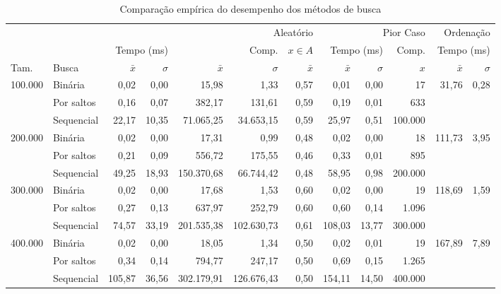 \begin{table}
\caption{Comparação empírica do desempenho dos métodos de busca}
\label{tab:resultados}
\begin{tabular}{llrrrrrrrrrr}
\toprule
 &  & \multicolumn{5}{r}{Aleatório} & \multicolumn{3}{r}{Pior Caso} & \multicolumn{2}{r}{Ordenação} \\
 \cmidrule(lr){3-7} \cmidrule(lr){8-10} \cmidrule(lr){11-12}
 &  & \multicolumn{2}{r}{Tempo (ms)} & \multicolumn{2}{r}{Comp.} & $x \in A$ & \multicolumn{2}{r}{Tempo (ms)} & Comp. & \multicolumn{2}{r}{Tempo (ms)} \\
 \cmidrule(lr){3-4} \cmidrule(lr){5-6} \cmidrule(lr){7-7} \cmidrule(lr){8-9} \cmidrule(lr){10-10} \cmidrule(lr){11-12}
 Tam. & Busca & $\bar{x}$ & $\sigma$ & $\bar{x}$ & $\sigma$ & $\bar{x}$ & $\bar{x}$ & $\sigma$ & $x$ & $\bar{x}$ & $\sigma$ \\
\midrule
\multirow[c]{3}{*}{100.000} & Binária & 0,02 & 0,00 & 15,98 & 1,33 & 0,57 & 0,01 & 0,00 & 17 & \multirow[r]{3}{*}{31,76} & \multirow[r]{3}{*}{0,28} \\
 & Por saltos & 0,16 & 0,07 & 382,17 & 131,61 & 0,59 & 0,19 & 0,01 & 633 \\
 & Sequencial & 22,17 & 10,35 & 71.065,25 & 34.653,15 & 0,59 & 25,97 & 0,51 & 100.000 \\
\cline{1-12}
\multirow[c]{3}{*}{200.000} & Binária & 0,02 & 0,00 & 17,31 & 0,99 & 0,48 & 0,02 & 0,00 & 18 & \multirow[r]{3}{*}{111,73} & \multirow[r]{3}{*}{3,95} \\
 & Por saltos & 0,21 & 0,09 & 556,72 & 175,55 & 0,46 & 0,33 & 0,01 & 895 \\
 & Sequencial & 49,25 & 18,93 & 150.370,68 & 66.744,42 & 0,48 & 58,95 & 0,98 & 200.000 \\
\cline{1-12}
\multirow[c]{3}{*}{300.000} & Binária & 0,02 & 0,00 & 17,68 & 1,53 & 0,60 & 0,02 & 0,00 & 19 & \multirow[r]{3}{*}{118,69} & \multirow[r]{3}{*}{1,59} \\
 & Por saltos & 0,27 & 0,13 & 637,97 & 252,79 & 0,60 & 0,60 & 0,14 & 1.096 \\
 & Sequencial & 74,57 & 33,19 & 201.535,38 & 102.630,73 & 0,61 & 108,03 & 13,77 & 300.000 \\
\cline{1-12}
\multirow[c]{3}{*}{400.000} & Binária & 0,02 & 0,00 & 18,05 & 1,34 & 0,50 & 0,02 & 0,01 & 19 & \multirow[r]{3}{*}{167,89} & \multirow[r]{3}{*}{7,89} \\
 & Por saltos & 0,34 & 0,14 & 794,77 & 247,17 & 0,50 & 0,69 & 0,15 & 1.265 \\
 & Sequencial & 105,87 & 36,56 & 302.179,91 & 126.676,43 & 0,50 & 154,11 & 14,50 & 400.000 \\

\end{tabular}
\end{table}
